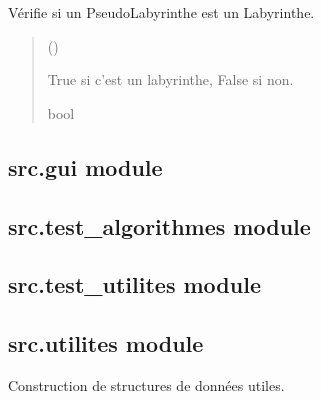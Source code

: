 \documentclass[letterpaper,10pt,french]{sphinxmanual}
\begin{document}

\begin{fulllineitems}
\label{\detokenize{src:src.algorithmes_docs.verifie_labyrinthe}}
\pysigstartsignatures
{}
\pysigstopsignatures
\sphinxAtStartPar
Vérifie si un PseudoLabyrinthe est un Labyrinthe.
\begin{quote}\begin{description}
\sphinxAtStartPar
{} ({\hyperref[\detokenize{src:src.utilites.PseudoLabyrinthe}]{}}) \textendash{} 

\sphinxAtStartPar
True si c’est un labyrinthe, False si non.

\sphinxAtStartPar
bool

\end{description}\end{quote}

\end{fulllineitems}



\subsection{src.gui module}
\label{\detokenize{src:src-gui-module}}

\subsection{src.test\_algorithmes module}
\label{\detokenize{src:src-test-algorithmes-module}}

\subsection{src.test\_utilites module}
\label{\detokenize{src:src-test-utilites-module}}

\subsection{src.utilites module}
\label{\detokenize{src:module-src.utilites}}\label{\detokenize{src:src-utilites-module}}
\sphinxAtStartPar
Construction de structures de données utiles.
\end{document}
